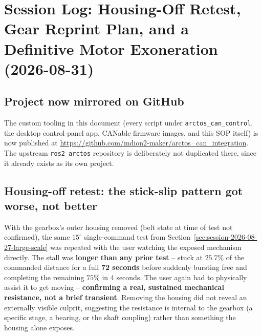 \documentclass[11pt,letterpaper]{article}
\begin{document}
\section{Session Log: Housing-Off Retest, Gear Reprint Plan, and a Definitive Motor Exoneration (2026-08-31)}
\label{sec:session-2026-08-31}

\subsection{Project now mirrored on GitHub}
The custom tooling in this document (every script under \texttt{arctos\_can\_control}, the desktop control-panel app, CANable firmware images, and this SOP itself) is now published at \url{https://github.com/mdion2-maker/arctos_can_integration}. The upstream \texttt{ros2\_arctos} repository is deliberately not duplicated there, since it already exists as its own project.

\subsection{Housing-off retest: the stick-slip pattern got worse, not better}
With the gearbox's outer housing removed (belt state at time of test not confirmed), the same $15^\circ$ single-command test from Section~\ref{sec:session-2026-08-27-large-scale} was repeated with the user watching the exposed mechanism directly. The stall was \textbf{longer than any prior test} -- stuck at $25.7\%$ of the commanded distance for a full \textbf{72 seconds} before suddenly bursting free and completing the remaining $75\%$ in 4 seconds. The user again had to physically assist it to get moving -- \textbf{confirming a real, sustained mechanical resistance, not a brief transient}. Removing the housing did not reveal an externally visible culprit, suggesting the resistance is internal to the gearbox (a specific stage, a bearing, or the shaft coupling) rather than something the housing alone exposes.
\end{document}
